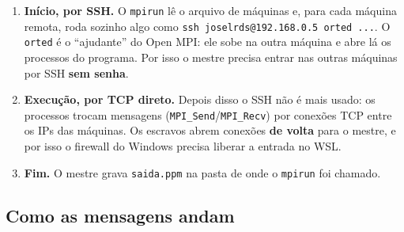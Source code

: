 \documentclass[a4paper,11pt]{article}
\begin{document}
\begin{enumerate}[leftmargin=*]
  \item \textbf{Início, por SSH.} O \texttt{mpirun} lê o arquivo de máquinas e, para cada máquina remota, roda sozinho algo como \texttt{ssh joselrds@192.168.0.5 orted ...}. O \texttt{orted} é o ``ajudante'' do Open MPI: ele sobe na outra máquina e abre lá os processos do programa. Por isso o mestre precisa entrar nas outras máquinas por SSH \textbf{sem senha}.
  \item \textbf{Execução, por TCP direto.} Depois disso o SSH não é mais usado: os processos trocam mensagens (\texttt{MPI\_Send}/\texttt{MPI\_Recv}) por conexões TCP entre os IPs das máquinas. Os escravos abrem conexões \textbf{de volta} para o mestre, e por isso o firewall do Windows precisa liberar a entrada no WSL.
  \item \textbf{Fim.} O mestre grava \texttt{saida.ppm} na pasta de onde o \texttt{mpirun} foi chamado.
\end{enumerate}

\subsection{Como as mensagens andam}

\begin{figure}[H]
\centering
{}
\end{figure}
\end{document}
